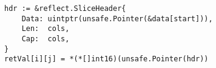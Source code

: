 \begin{lstlisting}[language=Golang, label=lst:labels-classexample-conversion-header, caption=Usage class example: conversion-header]
hdr := &reflect.SliceHeader{
    Data: uintptr(unsafe.Pointer(&data[start])),
    Len:  cols,
    Cap:  cols,
}
retVal[i][j] = *(*[]int16)(unsafe.Pointer(hdr))
\end{lstlisting}